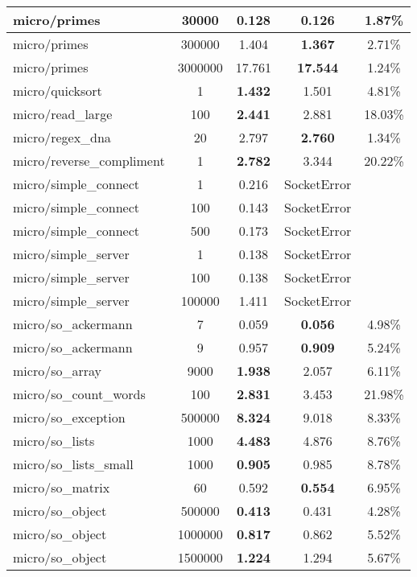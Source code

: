 \begin{center}
\begin{longtable}{l|c|c|c|c}
  micro/primes & 30000 & 0.128 & \textbf{0.126} & 1.87\% \\ \hline
  micro/primes & 300000 & 1.404 & \textbf{1.367} & 2.71\% \\ \hline
  micro/primes & 3000000 & 17.761 & \textbf{17.544} & 1.24\% \\ \hline
  micro/quicksort & 1 & \textbf{1.432} & 1.501 & 4.81\% \\ \hline
  micro/read\_large & 100 & \textbf{2.441} & 2.881 & 18.03\% \\ \hline
  micro/regex\_dna & 20 & 2.797 & \textbf{2.760} & 1.34\% \\ \hline
  micro/reverse\_compliment & 1 & \textbf{2.782} & 3.344 & 20.22\% \\ \hline
  micro/simple\_connect & 1 & 0.216 & SocketError &  \\ \hline
  micro/simple\_connect & 100 & 0.143 & SocketError &  \\ \hline
  micro/simple\_connect & 500 & 0.173 & SocketError &  \\ \hline
  micro/simple\_server & 1 & 0.138 & SocketError &  \\ \hline
  micro/simple\_server & 100 & 0.138 & SocketError &  \\ \hline
  micro/simple\_server & 100000 & 1.411 & SocketError &  \\ \hline
  micro/so\_ackermann & 7 & 0.059 & \textbf{0.056} & 4.98\% \\ \hline
  micro/so\_ackermann & 9 & 0.957 & \textbf{0.909} & 5.24\% \\ \hline
  micro/so\_array & 9000 & \textbf{1.938} & 2.057 & 6.11\% \\ \hline
  micro/so\_count\_words & 100 & \textbf{2.831} & 3.453 & 21.98\% \\ \hline
  micro/so\_exception & 500000 & \textbf{8.324} & 9.018 & 8.33\% \\ \hline
  micro/so\_lists & 1000 & \textbf{4.483} & 4.876 & 8.76\% \\ \hline
  micro/so\_lists\_small & 1000 & \textbf{0.905} & 0.985 & 8.78\% \\ \hline
  micro/so\_matrix & 60 & 0.592 & \textbf{0.554} & 6.95\% \\ \hline
  micro/so\_object & 500000 & \textbf{0.413} & 0.431 & 4.28\% \\ \hline
  micro/so\_object & 1000000 & \textbf{0.817} & 0.862 & 5.52\% \\ \hline
  micro/so\_object & 1500000 & \textbf{1.224} & 1.294 & 5.67\% \\ \hline

\end{longtable}
\end{center}
